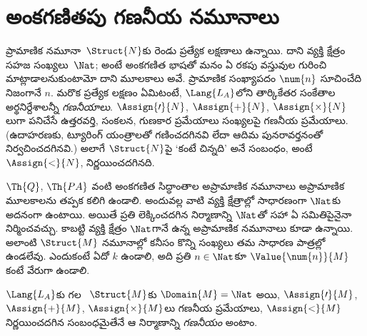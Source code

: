 \documentclass[../../../include/open-logic-section]{subfiles}
\begin{document}
\section{అంకగణితపు గణనీయ నమూనాలు}

\begin{explain}
ప్రామాణిక నమూనా~$\Struct{N}$కు రెండు ప్రత్యేక లక్షణాలు ఉన్నాయి. దాని
వ్యక్తి క్షేత్రం సహజ సంఖ్యలు~$\Nat$; అంటే అంకగణిత భాషతో మనం ఏ రకపు
వస్తువుల గురించి మాట్లాడాలనుకుంటామో దాని మూలకాలు అవే.
ప్రామాణిక సంఖ్యాపదం $\num{n}$ సూచించేది నిజంగానే $n$.
మరొక ప్రత్యేక లక్షణం ఏమిటంటే, $\Lang{L_A}$లోని తార్కికేతర సంకేతాల అర్థనిర్దేశాలన్నీ
\emph{గణనీయాలు}. $\Assign{\prime}{N}$, $\Assign{+}{N}$,
$\Assign{\times}{N}$లుగా పనిచేసే ఉత్తరవర్తి, సంకలన, గుణకార
ప్రమేయాలు సంఖ్యలపై గణనీయ ప్రమేయాలు. (ఉదాహరణకు, ట్యూరింగ్ యంత్రాలతో
గణించదగినవి లేదా ఆదిమ పునరావర్తనంతో నిర్వచించదగినవి.) అలాగే
$\Struct{N}$పై ‘కంటే చిన్నది’ అనే సంబంధం, అంటే $\Assign{<}{N}$,
నిర్ణయించదగినది.

$\Th{Q}$, $\Th{PA}$ వంటి అంకగణిత సిద్ధాంతాల అప్రామాణిక నమూనాలు
అప్రామాణిక మూలకాలను తప్పక కలిగి ఉండాలి. అందువల్ల వాటి వ్యక్తి
క్షేత్రాల్లో సాధారణంగా $\Nat$కు అదనంగా
 ఉంటాయి. అయితే ప్రతి లెక్కించదగిన
నిర్మాణాన్ని $\Nat$తో సహా ఏ
 సమితిపైనైనా
నిర్మించవచ్చు. కాబట్టి వ్యక్తి క్షేత్రం $\Nat$గానే ఉన్న
అప్రామాణిక నమూనాలు కూడా ఉన్నాయి. అలాంటి $\Struct{M}$ నమూనాల్లో
కనీసం కొన్ని సంఖ్యలు తమ సాధారణ పాత్రల్లో ఉండలేవు. ఎందుకంటే ఏదో
$k$ ఉండాలి, అది ప్రతి $n\in\Nat$కూ $\Value{\num{n}}{M}$ కంటే
వేరుగా ఉండాలి.
\end{explain}

\begin{defn}
$\Lang{L_A}$కు గల
~$\Struct{M}$కు
$\Domain{M}=\Nat$ అయి, $\Assign{\prime}{M}$, $\Assign{+}{M}$,
$\Assign{\times}{M}$లు గణనీయ ప్రమేయాలు, $\Assign{<}{M}$
నిర్ణయించదగిన సంబంధమైతేనే ఆ నిర్మాణాన్ని \emph{గణనీయం} అంటాం.
\end{defn}
\end{document}
